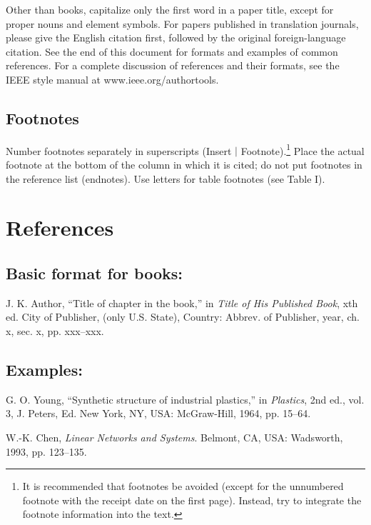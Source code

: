 \documentclass[journal]{IEEEtran}
\begin{document}
Other than books, capitalize only the first word in a paper title, except for proper nouns and element symbols. For papers published in translation journals, please give the English citation first, followed by the original foreign-language citation. See the end of this document for formats and examples of common references. For a complete discussion of references and their formats, see the IEEE style manual at www.ieee.org/authortools.

\subsection{Footnotes}

Number footnotes separately in superscripts (Insert $\mid$ Footnote).\footnote{It is recommended that footnotes be avoided (except for the unnumbered footnote with the receipt date on the first page). Instead, try to integrate the footnote information into the text.}  Place the actual footnote at the bottom of the column in which it is cited; do not put footnotes in the reference list (endnotes). Use letters for table footnotes (see Table I). 


\section*{References}

\subsection*{Basic format for books:}

J. K. Author, ``Title of chapter in the book,'' in {\em Title of His Published Book}, xth ed. City of Publisher, (only U.S. State), Country: Abbrev. of Publisher, year, ch. x, sec. x, pp. xxx--xxx.

\subsection*{Examples:}

\begin{thebibliography}{34}

\bibitem{}G. O. Young, ``Synthetic structure of industrial plastics,'' in {\em Plastics}, 2nd ed., vol. 3, J. Peters, Ed. New York, NY, USA: McGraw-Hill, 1964, pp. 15--64.

\bibitem{}W.-K. Chen, {\it Linear Networks and Systems}. Belmont, CA, USA: Wadsworth, 1993, pp. 123--135.

\end{thebibliography}
\end{document}
